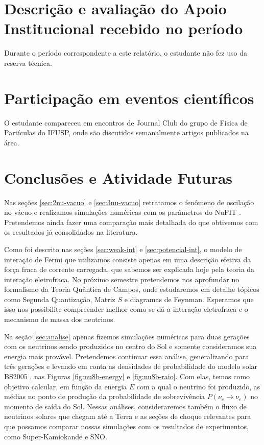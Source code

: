 \documentclass[12pt]{report}
\begin{document}
\pagebreak

\chapter{Descrição e avaliação do Apoio Institucional recebido no período}\label{chp:apoioInst}

Durante o período correspondente a este relatório, o estudante não fez uso da reserva técnica.

\chapter{Participação em eventos científicos}\label{chp:particEvento}

O estudante compareceu em encontros de Journal Club do grupo de Física de Partículas do IFUSP, onde são discutidos semanalmente artigos publicados na área.

\chapter{Conclusões e Atividade Futuras}

Nas seções \ref{sec:2nu-vacuo} e \ref{sec:3nu-vacuo} retratamos o fenômeno de oscilação no vácuo e realizamos simulações numéricas com os parâmetros do NuFIT \cite{nufit}. Pretendemos ainda fazer uma comparação mais detalhada do que obtivemos com os resultados já consolidados na literatura.

Como foi descrito nas seções \ref{sec:weak-int} e \ref{sec:potencial-int}, o modelo de interação de Fermi que utilizamos consiste apenas em uma descrição efetiva da força fraca de corrente carregada, que sabemos ser explicada hoje pela teoria da interação eletrofraca. No próximo semestre pretendemos nos aprofundar no formalismo da Teoria Quântica de Campos, onde estudaremos em detalhe tópicos como Segunda Quantização, Matriz $S$ e diagramas de Feynman. Esperamos que isso nos possibilite compreender melhor como se dá a interação eletrofraca e o mecanismo de massa dos neutrinos.

Na seção \ref{sec:analise} apenas fizemos simulações numéricas para duas gerações com os neutrinos sendo produzidos no centro do Sol e somente consideramos sua energia mais provável. Pretendemos continuar essa análise, generalizando para três gerações e levando em conta as densidades de probabilidade do modelo solar BS2005 \cite{bahcall-model}, nas Figuras \ref{fig:nu8b-energy} e \ref{fig:nu8b-raio}. Com elas, temos como objetivo calcular, em função da energia $E$ com a qual o neutrino foi produzido, as médias no ponto de produção da probabilidade de sobrevivência $P(\nu_e \to \nu_e)$ no momento de saída do Sol. Nessas análises, consideraremos também o fluxo de neutrinos solares que chegam até a Terra e as seções de choque relevantes para que possamos comparar nossas simulações com os resultados de experimentos, como Super-Kamiokande e SNO.
\end{document}
